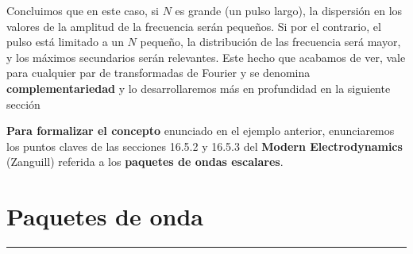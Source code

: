 Concluimos que en este caso, si $N$ es grande (un pulso largo), la dispersión en los valores de la amplitud de la frecuencia serán pequeños. Si por el contrario, el pulso está limitado a un $N$ pequeño, la distribución de las frecuencia será mayor, y los máximos secundarios serán relevantes. Este hecho que acabamos de ver, vale para cualquier par de transformadas de Fourier y se denomina \textbf{complementariedad} y lo desarrollaremos más en profundidad en la siguiente sección

\newpage
\begin{intro}{}
\textbf{Para formalizar el concepto} enunciado en el ejemplo anterior, enunciaremos los puntos claves de las secciones 16.5.2 y 16.5.3  del \textbf{Modern Electrodynamics} (Zanguill) referida a los \textbf{paquetes de ondas escalares}.
\end{intro}

\section{\huge{Paquetes de onda}}

\textcolor{myred}{\hrule}

